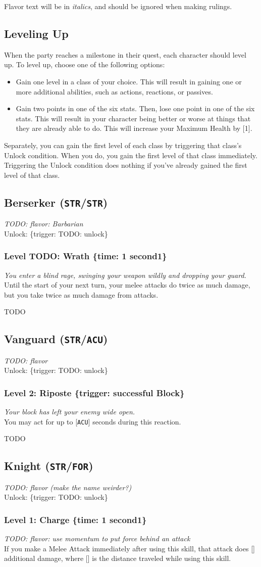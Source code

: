 \documentclass[12pt]{article}
\newcommand{\STR}{\texttt{STR}}
\newcommand{\ACU}{\texttt{ACU}}
\newcommand{\FOR}{\texttt{FOR}}
\newcommand{\X}{\text{{\lower 0.2mm \hbox{X}}}}
\newcommand{\TIME}[1]{\{time: #1 second\if1#1{}\else{s}\fi\}}
\newcommand{\TRIG}[1]{\{trigger: #1\}}
\newcommand{\Class}[4]{\pagebreak\subsection{#1 (#2)}\label{#1}\textit{#3}\\[1mm]Unlock: \TRIG{#4}}
\newcommand{\Skill}[5]{\subsubsection{Level #1: #2 #3}\textit{#4}\\[1mm]#5}
\begin{document}
Flavor text will be in \textit{italics}, and should be ignored when making rulings.

\subsection{Leveling Up}

When the party reaches a milestone in their quest, each character should level up. To level up, choose one of the following options:
\begin{itemize}
\item Gain one level in a class of your choice. This will result in gaining one or more additional abilities, such as actions, reactions, or passives.
\item Gain two points in one of the six stats. Then, lose one point in one of the six stats. This will result in your character being better or worse at things that they are already able to do. This will increase your Maximum Health by [1].
\end{itemize}

Separately, you can gain the first level of each class by triggering that class's Unlock condition. When you do, you gain the first level of that class immediately. Triggering the Unlock condition does nothing if you've already gained the first level of that class.

%

\Class{Berserker}{\STR/\STR}
{TODO: flavor: Barbarian}
{TODO: unlock}

\Skill{TODO}{Wrath}{\TIME{1}}
{You enter a blind rage, swinging your weapon wildly and dropping your guard.}
{Until the start of your next turn, your melee attacks do twice as much damage, but you take twice as much damage from attacks.}

TODO

%

%

%

\Class{Vanguard}{\STR/\ACU}
{TODO: flavor}
{TODO: unlock}

\Skill{2}{Riposte}{\TRIG{successful Block}}
{Your block has left your enemy wide open.}
{You may act for up to [\ACU] seconds during this reaction.}

TODO

%

%

\Class{Knight}{\STR/\FOR}
{TODO: flavor (make the name weirder?)}
{TODO: unlock}

\Skill{1}{Charge}{\TIME{1}}
{TODO: flavor: use momentum to put force behind an attack}
{If you make a Melee Attack immediately after using this skill, that attack does [\X] additional damage, where [\X] is the distance traveled while using this skill.}
\end{document}
